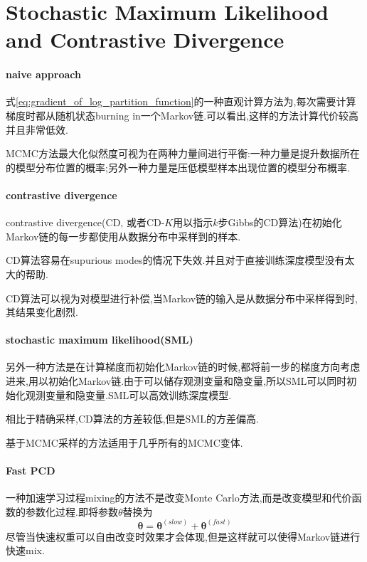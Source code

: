 \section{Stochastic Maximum Likelihood and Contrastive Divergence}

\paragraph{naive approach}式\ref{eq:gradient_of_log_partition_function}的一种直观计算方法为,每次需要计算梯度时都从随机状态burning in一个Markov链.可以看出,这样的方法计算代价较高并且非常低效.

MCMC方法最大化似然度可视为在两种力量间进行平衡:一种力量是提升数据所在的模型分布位置的概率;另外一种力量是压低模型样本出现位置的模型分布概率.

\paragraph{contrastive divergence}contrastive divergence(CD, 或者CD-$K$用以指示$k$步Gibbs的CD算法)在初始化Markov链的每一步都使用从数据分布中采样到的样本.

CD算法容易在supurious modes的情况下失效.并且对于直接训练深度模型没有太大的帮助.

CD算法可以视为对模型进行补偿,当Markov链的输入是从数据分布中采样得到时,其结果变化剧烈.

\paragraph{stochastic maximum likelihood(SML)}另外一种方法是在计算梯度而初始化Markov链的时候,都将前一步的梯度方向考虑进来,用以初始化Markov链.由于可以储存观测变量和隐变量,所以SML可以同时初始化观测变量和隐变量.SML可以高效训练深度模型.

相比于精确采样,CD算法的方差较低,但是SML的方差偏高.

基于MCMC采样的方法适用于几乎所有的MCMC变体.

\paragraph{Fast PCD}一种加速学习过程mixing的方法不是改变Monte Carlo方法,而是改变模型和代价函数的参数化过程.即将参数$\theta$替换为
\begin{equation}
\bm\theta=\bm\theta^{(slow)}+\bm\theta^{(fast)}
\end{equation}
尽管当快速权重可以自由改变时效果才会体现,但是这样就可以使得Markov链进行快速mix.

